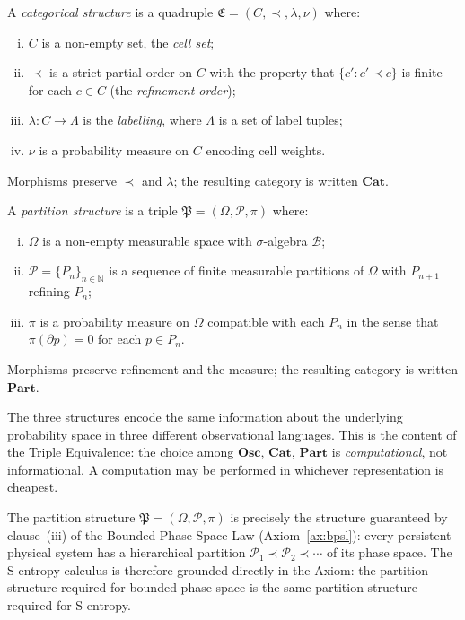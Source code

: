 \begin{definition}\label{def:cat-mono}
A \emph{categorical structure} is a quadruple
$\mathfrak{E} = (C, \prec, \lambda, \nu)$
where:
\begin{enumerate}[(i)]
  \item $C$ is a non-empty set, the \emph{cell set};
  \item $\prec$ is a strict partial order on $C$ with the property that
    $\{c' : c' \prec c\}$ is finite for each $c \in C$
    (the \emph{refinement order});
  \item $\lambda : C \to \Lambda$ is the \emph{labelling}, where $\Lambda$ is
    a set of label tuples;
  \item $\nu$ is a probability measure on $C$ encoding cell weights.
\end{enumerate}
Morphisms preserve $\prec$ and $\lambda$; the resulting category is
written $\mathbf{Cat}$.
\end{definition}

\begin{definition}\label{def:part-mono}
A \emph{partition structure} is a triple
$\mathfrak{P} = (\Omega, \mathscr{P}, \pi)$
where:
\begin{enumerate}[(i)]
  \item $\Omega$ is a non-empty measurable space with $\sigma$-algebra
    $\mathscr{B}$;
  \item $\mathscr{P} = \{P_n\}_{n \in \mathbb{N}}$ is a sequence of finite
    measurable partitions of $\Omega$ with $P_{n+1}$ refining $P_n$;
  \item $\pi$ is a probability measure on $\Omega$ compatible with each $P_n$
    in the sense that $\pi(\partial p) = 0$ for each $p \in P_n$.
\end{enumerate}
Morphisms preserve refinement and the measure; the resulting category is
written $\mathbf{Part}$.
\end{definition}

The three structures encode the same information about the underlying
probability space in three different observational languages.  This is the
content of the Triple Equivalence: the choice among
$\mathbf{Osc}$, $\mathbf{Cat}$, $\mathbf{Part}$ is \emph{computational}, not
informational.  A computation may be performed in whichever representation is
cheapest.

\begin{remark}
The partition structure $\mathfrak{P} = (\Omega, \mathscr{P}, \pi)$ is
precisely the structure guaranteed by clause~(iii) of the Bounded Phase Space
Law (Axiom~\ref{ax:bpsl}): every persistent physical system has a hierarchical
partition $\mathcal{P}_1 \prec \mathcal{P}_2 \prec \cdots$ of its phase space.
The S-entropy calculus is therefore grounded directly in the Axiom: the
partition structure required for bounded phase space is the same partition
structure required for S-entropy.
\end{remark}

